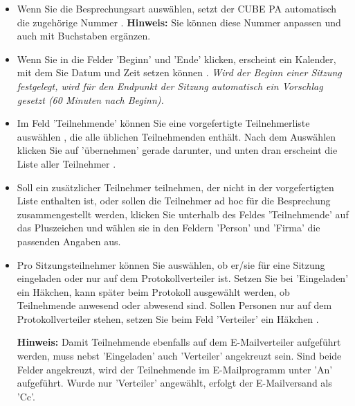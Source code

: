 \begin{itemize}
\item 
Wenn Sie die Besprechungsart auswählen, setzt der CUBE PA automatisch die zugehörige Nummer . \textbf{Hinweis:} Sie können diese Nummer anpassen und auch mit Buchstaben ergänzen.
\item 
Wenn Sie in die Felder 'Beginn' und 'Ende' klicken, erscheint ein Kalender, mit dem Sie Datum und Zeit setzen können . \textit{Wird der Beginn einer Sitzung festgelegt, wird für den Endpunkt der Sitzung automatisch ein Vorschlag gesetzt (60 Minuten nach Beginn).}
\item 
Im Feld 'Teilnehmende' können Sie eine vorgefertigte Teilnehmerliste auswählen , die alle üblichen Teilnehmenden enthält. Nach dem Auswählen klicken Sie auf 'übernehmen'  gerade darunter, und unten dran erscheint die Liste aller Teilnehmer .
\item 
Soll ein zusätzlicher Teilnehmer teilnehmen, der nicht in der vorgefertigten Liste enthalten ist, oder sollen die Teilnehmer ad hoc für die Besprechung zusammengestellt werden, klicken Sie unterhalb des Feldes 'Teilnehmende' auf das Pluszeichen  und wählen sie in den Feldern 'Person' und 'Firma' die passenden Angaben aus. 
\item
Pro Sitzungsteilnehmer können Sie auswählen, ob er/sie für eine Sitzung eingeladen oder nur auf dem Protokollverteiler ist. Setzen Sie bei 'Eingeladen'  ein Häkchen, kann später beim Protokoll ausgewählt werden, ob Teilnehmende anwesend oder abwesend sind. Sollen Personen nur auf dem Protokollverteiler stehen, setzen Sie beim Feld 'Verteiler' ein Häkchen .

\vspace{\baselineskip}

\textbf{Hinweis:} Damit Teilnehmende ebenfalls auf dem E-Mailverteiler aufgeführt werden, muss nebst 'Eingeladen' auch 'Verteiler' angekreuzt sein. Sind beide Felder angekreuzt, wird der Teilnehmende im E-Mailprogramm unter 'An' aufgeführt. Wurde nur 'Verteiler' angewählt, erfolgt der E-Mailversand als 'Cc'.

\vspace{\baselineskip}


\end{itemize}

